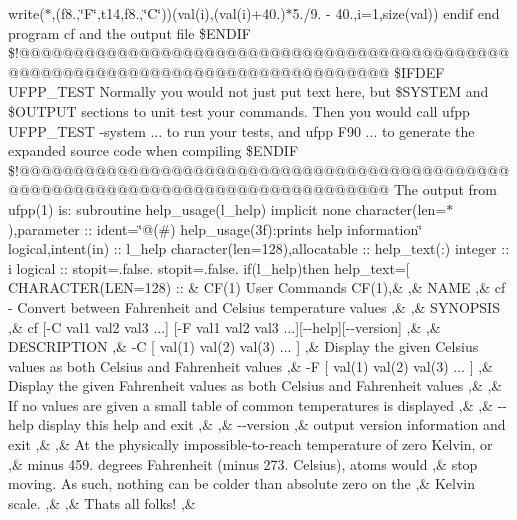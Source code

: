 \begin{DoxyCompactItemize}
write($\ast$,\textquotesingle{}(f8.,\char`\"{}\+F\char`\"{},t14,f8.,\char`\"{}\+C\char`\"{})\textquotesingle{})(val(i),(val(i)+40.)$\ast$5./9. -\/ 40.,i=1,size(val)) endif end program cf and the output file \$\+E\+N\+D\+I\+F \$!@@@@@@@@@@@@@@@@@@@@@@@@@@@@@@@@@@@@@@@@@@@@@@@@@@@@@@@@@@@@@@@@@@@@@@@@@@@@@@@@ \$\+I\+F\+D\+E\+F U\+F\+P\+P\+\_\+\+T\+E\+S\+T Normally you would not just put text here, but \$\+S\+Y\+S\+T\+E\+M and \$\+O\+U\+T\+P\+U\+T sections to unit test your commands. Then you would call ufpp U\+F\+P\+P\+\_\+\+T\+E\+S\+T -\/system ... to run your tests, and ufpp F90 ... to generate the expanded source code when compiling \$\+E\+N\+D\+I\+F \$!@@@@@@@@@@@@@@@@@@@@@@@@@@@@@@@@@@@@@@@@@@@@@@@@@@@@@@@@@@@@@@@@@@@@@@@@@@@@@@@@ The output from ufpp(1) is\+: subroutine help\+\_\+usage(l\+\_\+help) implicit none character(len=$\ast$),parameter \+:: ident=\char`\"{}@(\#) help\+\_\+usage(3f)\+:prints help information\char`\"{} logical,intent(in) \+:: l\+\_\+help character(len=128),allocatable \+:: help\+\_\+text(\+:) integer \+:: i logical \+:: stopit=.\+false. stopit=.\+false. if(l\+\_\+help)then help\+\_\+text=\mbox{[} C\+H\+A\+R\+A\+C\+T\+E\+R(\+L\+E\+N=128) \+:: \& \textquotesingle{}\+C\+F(1) User Commands C\+F(1)\textquotesingle{},\& \textquotesingle{} \textquotesingle{},\& \textquotesingle{}\+N\+A\+M\+E \textquotesingle{},\& \textquotesingle{} cf -\/ Convert between Fahrenheit and Celsius temperature values \textquotesingle{},\& \textquotesingle{} \textquotesingle{},\& \textquotesingle{}\+S\+Y\+N\+O\+P\+S\+I\+S \textquotesingle{},\& \textquotesingle{} cf \mbox{[}-\/\+C val1 val2 val3 ...\mbox{]} \mbox{[}-\/\+F val1 val2 val3 ...\mbox{]}\mbox{[}-\/-\/help\mbox{]}\mbox{[}-\/-\/version\mbox{]} \textquotesingle{},\& \textquotesingle{} \textquotesingle{},\& \textquotesingle{}\+D\+E\+S\+C\+R\+I\+P\+T\+I\+O\+N \textquotesingle{},\& \textquotesingle{} -\/\+C \mbox{[} val(1) val(2) val(3) ... \mbox{]} \textquotesingle{},\& \textquotesingle{} Display the given Celsius values as both Celsius and Fahrenheit values \textquotesingle{},\& \textquotesingle{} -\/\+F \mbox{[} val(1) val(2) val(3) ... \mbox{]} \textquotesingle{},\& \textquotesingle{} Display the given Fahrenheit values as both Celsius and Fahrenheit values \textquotesingle{},\& \textquotesingle{} \textquotesingle{},\& \textquotesingle{} If no values are given a small table of common temperatures is displayed \textquotesingle{},\& \textquotesingle{} \textquotesingle{},\& \textquotesingle{} -\/-\/help display this help and exit \textquotesingle{},\& \textquotesingle{} \textquotesingle{},\& \textquotesingle{} -\/-\/version \textquotesingle{},\& \textquotesingle{} output version information and exit \textquotesingle{},\& \textquotesingle{} \textquotesingle{},\& \textquotesingle{} At the physically impossible-\/to-\/reach temperature of zero Kelvin, or \textquotesingle{},\& \textquotesingle{} minus 459. degrees Fahrenheit (minus 273. Celsius), atoms would \textquotesingle{},\& \textquotesingle{} stop moving. As such, nothing can be colder than absolute zero on the \textquotesingle{},\& \textquotesingle{} Kelvin scale. \textquotesingle{},\& \textquotesingle{} \textquotesingle{},\& \textquotesingle{} That\textquotesingle{}\textquotesingle{}s all folks! \textquotesingle{},\& 
\end{DoxyCompactItemize}
